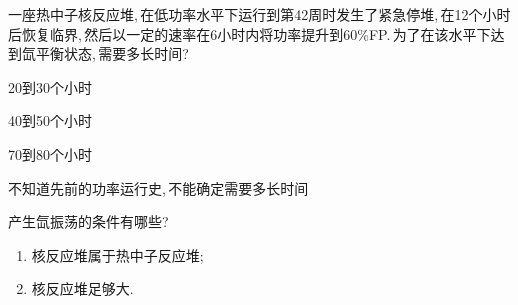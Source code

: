 \begin{exercise}
    一座热中子核反应堆,\,在低功率水平下运行到第42周时发生了紧急停堆,\,在12个小时后恢复临界,\,然后以一定的速率在6小时内将功率提升到60\%FP.\,为了在该水平下达到氙平衡状态,\,需要多长时间?\,\xparen
    \begin{xchoices}[showanswer=true]
        \item 20到30个小时
        \item 40到50个小时
        \item* 70到80个小时
        \item 不知道先前的功率运行史,\,不能确定需要多长时间
    \end{xchoices}
    \vspace{1em}
\end{exercise}

\begin{exercise}
    产生氙振荡的条件有哪些?\,
    \begin{solution}
        \begin{enumerate}[(1)]
            \item 核反应堆属于热中子反应堆;
            \item 核反应堆足够大.
        \end{enumerate}
    \end{solution}
\end{exercise}